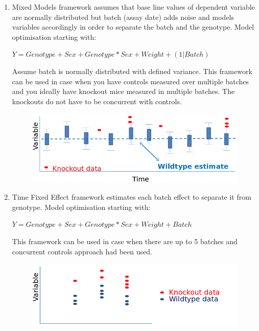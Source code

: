 \documentclass[12pt,a4paper]{article}
\begin{document}
\begin{enumerate}
\item Mixed Models framework assumes that base line values of dependent variable are normally distributed but batch (assay date) adds noise and models variables accordingly in order to separate the batch and the genotype. 
Model optimisation starting with:

$Y=Genotype+Sex+Genotype*Sex + Weight + (1|Batch)$

Assume batch is normally distributed with defined variance. This framework can be used in case when you have controls measured over multiple batches and you ideally have knockout mice measured in multiple batches. The knockouts do not have to be concurrent with controls.
\begin{figure}[!htpb]%
\centerline{\includegraphics[scale=0.4]{MM_simple.png}}
\end{figure}

\item Time Fixed Effect framework estimates each batch effect to separate it from genotype.
Model optimisation starting with:

$Y=Genotype+Sex+Genotype*Sex + Weight + Batch$

This framework can be used in case when there are up to 5 batches and concurrent controls approach had been used. 
\begin{figure}[!htpb]%
\centerline{\includegraphics[scale=0.4]{TFE_simple.png}}
\end{figure}


\end{enumerate}
\end{document}
